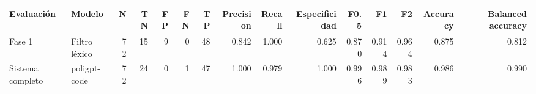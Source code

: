 \begin{tabular}{llrrrrrrrrrrrrr}
\toprule
Evaluación & Modelo & N & TN & FP & FN & TP & Precision & Recall & Especificidad & F0.5 & F1 & F2 & Accuracy & Balanced accuracy \\
\midrule
Fase 1 & Filtro léxico & 72 & 15 & 9 & 0 & 48 & 0.842 & 1.000 & 0.625 & 0.870 & 0.914 & 0.964 & 0.875 & 0.812 \\
Sistema completo & poligpt-code & 72 & 24 & 0 & 1 & 47 & 1.000 & 0.979 & 1.000 & 0.996 & 0.989 & 0.983 & 0.986 & 0.990 \\
\bottomrule
\end{tabular}
